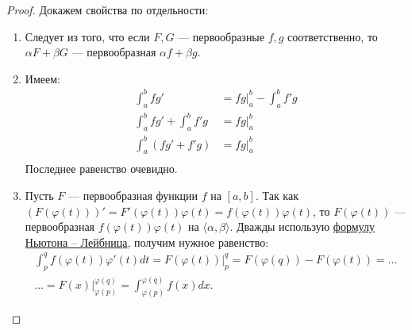 \begin{proof}
	Докажем свойства по отдельности:
	\begin{enumerate}
		\item Следует из того, что если $F, G$ --- первообразные $f, g$ соответственно,
		то $\alpha F + \beta G$ --- первообразная $\alpha f + \beta g$.
		\item Имеем:
		\begin{align*}
			\int_a^b fg' &= fg \bigg|_a^b - \int_a^b f'g \\
			\int_a^b fg' + \int_a^b f'g &= fg \bigg|_a^b \\
			\int_a^b (fg' + f'g) &= fg \bigg|_a^b		   \\
		\end{align*}
		Последнее равенство очевидно.
		\item Пусть $F$ --- первообразная функции $f$ на $[a, b]$. Так как \\ 
		\hbox{$(F(\varphi(t)))' = F'(\varphi(t)) \varphi(t) = f(\varphi(t)) \varphi(t)$}, то
		$F(\varphi(t))$ --- первообразная $f(\varphi(t)) \varphi(t)$ на $\langle \alpha, \beta \rangle$.
		Дважды использую \hyperlink{Newton}{формулу Ньютона -- Лейбница}, получим нужное равенство:
		\begin{align*}
	 		\int_p^q f(\varphi(t))\varphi'(t) dt = F(\varphi(t)) \bigg|_p^q = F(\varphi(q)) - F(\varphi(t)) = \ldots \\
			\ldots = F(x) \bigg|_{\varphi(p)}^{\varphi(q)} = \int_{\varphi(p)}^{\varphi(q)} f(x) dx.
		\end{align*}
	\end{enumerate}
\end{proof}


















